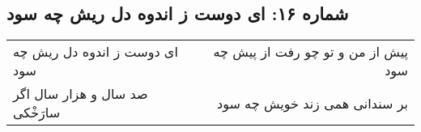 \begin{center}
\section*{شماره ۱۶: ای دوست ز اندوه دل ریش چه سود}
\label{sec:016}
\begin{longtable}{l p{0.5cm} r}
ای دوست ز اندوه دل ریش چه سود
&&
پیش از من و تو چو رفت از پیش چه سود
\\
صد سال و هزار سال اگر سارَخْکی
&&
بر سندانی همی زند خویش چه سود
\\
\end{longtable}
\end{center}
